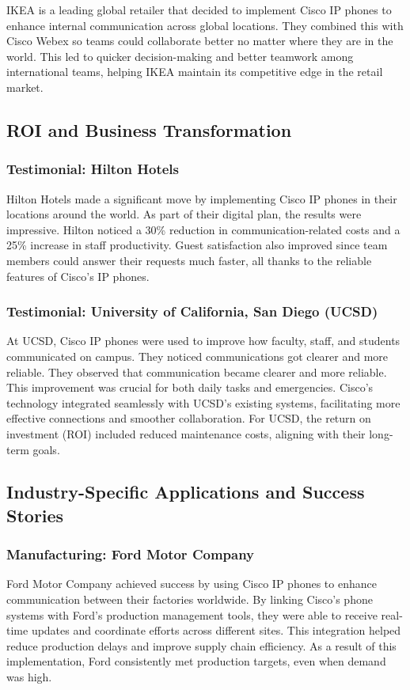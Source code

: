 \documentclass[11pt,a4paper]{article}
\begin{document}
IKEA is a leading global retailer that decided to implement Cisco IP phones to enhance internal communication across global locations. They combined this with Cisco Webex so teams could collaborate better no matter where they are in the world. This led to quicker decision-making and better teamwork among international teams, helping IKEA maintain its competitive edge in the retail market.


\subsection*{ROI and Business Transformation}

\subsubsection*{Testimonial: Hilton Hotels}

Hilton Hotels made a significant move by implementing Cisco IP phones in their locations around the world. As part of their digital plan, the results were impressive. Hilton noticed a 30\% reduction in communication-related costs and a 25\% increase in staff productivity. Guest satisfaction also improved since team members could answer their requests much faster, all thanks to the reliable features of Cisco’s IP phones.


\subsubsection*{Testimonial: University of California, San Diego (UCSD)}

At UCSD, Cisco IP phones were used to improve how faculty, staff, and students communicated on campus. They noticed communications got clearer and more reliable. They observed that communication became clearer and more reliable. This improvement was crucial for both daily tasks and emergencies. Cisco's technology integrated seamlessly with UCSD’s existing systems, facilitating more effective connections and smoother collaboration. For UCSD, the return on investment (ROI) included reduced maintenance costs, aligning with their long-term goals.

\subsection*{Industry-Specific Applications and Success Stories}

\subsubsection*{Manufacturing: Ford Motor Company}
Ford Motor Company achieved success by using Cisco IP phones to enhance communication between their factories worldwide. By linking Cisco’s phone systems with Ford's production management tools, they were able to receive real-time updates and coordinate efforts across different sites. This integration helped reduce production delays and improve supply chain efficiency. As a result of this implementation, Ford consistently met production targets, even when demand was high.
\end{document}
